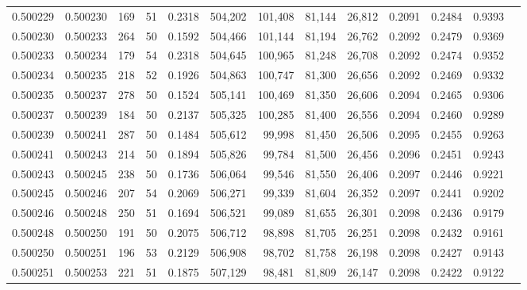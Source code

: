 \begin{tabular}{rrrrrrrrrrrrr}
0.500229 & 0.500230 & 169 &  51 &                                     0.2318 & 504,202 & 101,408 &  81,144 &  26,812 & 0.2091 & 0.2484 & 0.9393 \\
0.500230 & 0.500233 & 264 &  50 &                                     0.1592 & 504,466 & 101,144 &  81,194 &  26,762 & 0.2092 & 0.2479 & 0.9369 \\
0.500233 & 0.500234 & 179 &  54 &                                     0.2318 & 504,645 & 100,965 &  81,248 &  26,708 & 0.2092 & 0.2474 & 0.9352 \\
0.500234 & 0.500235 & 218 &  52 &                                     0.1926 & 504,863 & 100,747 &  81,300 &  26,656 & 0.2092 & 0.2469 & 0.9332 \\
0.500235 & 0.500237 & 278 &  50 &                                     0.1524 & 505,141 & 100,469 &  81,350 &  26,606 & 0.2094 & 0.2465 & 0.9306 \\
0.500237 & 0.500239 & 184 &  50 &                                     0.2137 & 505,325 & 100,285 &  81,400 &  26,556 & 0.2094 & 0.2460 & 0.9289 \\
0.500239 & 0.500241 & 287 &  50 &                                     0.1484 & 505,612 &  99,998 &  81,450 &  26,506 & 0.2095 & 0.2455 & 0.9263 \\
0.500241 & 0.500243 & 214 &  50 &                                     0.1894 & 505,826 &  99,784 &  81,500 &  26,456 & 0.2096 & 0.2451 & 0.9243 \\
0.500243 & 0.500245 & 238 &  50 &                                     0.1736 & 506,064 &  99,546 &  81,550 &  26,406 & 0.2097 & 0.2446 & 0.9221 \\
0.500245 & 0.500246 & 207 &  54 &                                     0.2069 & 506,271 &  99,339 &  81,604 &  26,352 & 0.2097 & 0.2441 & 0.9202 \\
0.500246 & 0.500248 & 250 &  51 &                                     0.1694 & 506,521 &  99,089 &  81,655 &  26,301 & 0.2098 & 0.2436 & 0.9179 \\
0.500248 & 0.500250 & 191 &  50 &                                     0.2075 & 506,712 &  98,898 &  81,705 &  26,251 & 0.2098 & 0.2432 & 0.9161 \\
0.500250 & 0.500251 & 196 &  53 &                                     0.2129 & 506,908 &  98,702 &  81,758 &  26,198 & 0.2098 & 0.2427 & 0.9143 \\
0.500251 & 0.500253 & 221 &  51 &                                     0.1875 & 507,129 &  98,481 &  81,809 &  26,147 & 0.2098 & 0.2422 & 0.9122 \\

\end{tabular}
